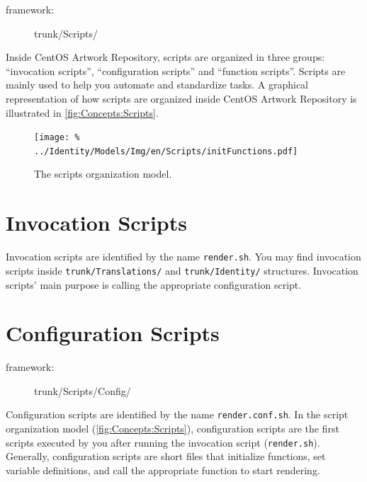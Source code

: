 
\begin{description}
\item[framework:] trunk/Scripts/
\end{description}

\noindent Inside CentOS Artwork Repository, scripts are organized in
three groups: ``invocation scripts'', ``configuration scripts'' and
``function scripts''. Scripts are mainly used to help you automate and
standardize tasks. A graphical representation of how scripts are
organized inside CentOS Artwork Repository is illustrated in
\autoref{fig:Concepts:Scripts}.

\begin{figure}[!hbp]
\centering
\texttt{[image: \%
   ../Identity/Models/Img/en/Scripts/initFunctions.pdf]}
\caption{The scripts organization model.%
   \label{fig:Concepts:Scripts}}
\end{figure}

\section{Invocation Scripts}
\hypertarget{sec:Concepts:Scripts:Invocation}{}
\label{sec:Concepts:Scripts:Invocation}

Invocation scripts are identified by the name \texttt{render.sh}. You
may find invocation scripts inside \texttt{trunk/Translations/} and
\texttt{trunk/Identity/} structures.  Invocation scripts' main purpose
is calling the appropriate configuration script.

\section{Configuration Scripts}
\hypertarget{sec:Concepts:Scripts:Configuration}{}
\label{sec:Concepts:Scripts:Configuration}

\begin{description}
\item[framework:] trunk/Scripts/Config/
\end{description}

\noindent Configuration scripts are identified by the name
\texttt{render.conf.sh}. In the script organization model
(\autoref{fig:Concepts:Scripts}), configuration scripts are the first
scripts executed by you after running the invocation script
(\texttt{render.sh}).  Generally, configuration scripts are short
files that initialize functions, set variable definitions, and call
the appropriate function to start rendering.


